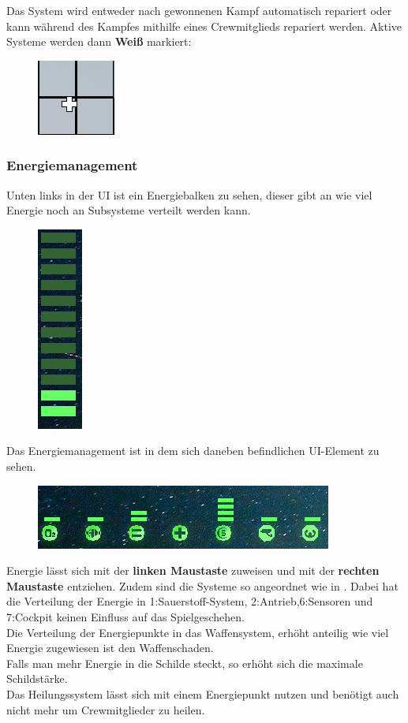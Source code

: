 \documentclass[fontsize=12pt,paper=a4,twoside]{scrartcl}
\begin{document}
Das System wird entweder nach gewonnenen Kampf automatisch repariert oder kann während des Kampfes mithilfe eines Crewmitglieds repariert werden. Aktive Systeme werden dann \textbf{Weiß} markiert:

\begin{figure}[H]
\centering
\includegraphics[width=0.2\linewidth]{DasSpiel/Ui/heal_on2.png}
\end{figure}

\subsubsection{Energiemanagement} \label{sec:Energiemanagement}
Unten links in der UI ist ein Energiebalken zu sehen, dieser gibt an wie viel Energie noch an Subsysteme verteilt werden kann.
\begin{figure}[H]
\centering
\includegraphics[width=0.05\linewidth]{DasSpiel/Ui/power.png}
\end{figure}
Das Energiemanagement ist in dem sich daneben befindlichen UI-Element zu sehen.

\begin{figure}[H]
\centering
\includegraphics[width=0.7\linewidth]{DasSpiel/Ui/systems.png}
\end{figure} 

Energie lässt sich mit der \textbf{linken Maustaste} zuweisen und mit der \textbf{rechten Maustaste} entziehen.
Zudem sind die Systeme so angeordnet wie in . Dabei hat die Verteilung der Energie in 1:Sauerstoff-System, 2:Antrieb,6:Sensoren und 7:Cockpit keinen Einfluss auf das Spielgeschehen.
\\
Die Verteilung der Energiepunkte in das Waffensystem, erhöht anteilig wie viel Energie zugewiesen ist den Waffenschaden.
\\
Falls man mehr Energie in die Schilde steckt, so erhöht sich die maximale Schildstärke.
\\
Das Heilungssystem lässt sich mit einem Energiepunkt nutzen und benötigt auch nicht mehr um Crewmitglieder zu heilen. 
\end{document}
